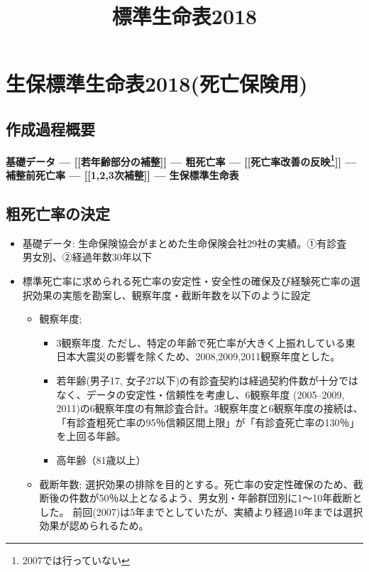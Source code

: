 \documentclass[]{article}
\begin{document}
\title{標準生命表2018\citep{lifetable2018}}

\section*{生保標準生命表2018(死亡保険用)}
\subsection*{作成過程概要}

\bf{基礎データ} --- [[若年齢部分の補整]] --- \bf{粗死亡率} 
--- [[死亡率改善の反映\footnote{2007では行っていない}]] --- \bf{補整前死亡率} --- [[1,2,3次補整]] --- \bf{生保標準生命表}

\subsection*{粗死亡率の決定}

\begin{itemize}
    \item 基礎データ: 生命保険協会がまとめた生命保険会社29社の実績。①有診査　男女別、②経過年数30年以下
    \item 標準死亡率に求められる死亡率の安定性・安全性の確保及び経験死亡率の選択効果の実態を勘案し、観察年度・截断年数を以下のように設定
    \begin{itemize}
        \item 観察年度; 
        \begin{itemize}
            \item 3観察年度. ただし、特定の年齢で死亡率が大きく上振れしている東日本大震災の影響を除くため、2008,2009,2011観察年度とした。
            \item 若年齢(男子17, 女子27以下)の有診査契約は経過契約件数が十分ではなく、データの安定性・信頼性を考慮し、6観察年度 (2005--2009, 2011)の6観察年度の有無診査合計。3観察年度と6観察年度の接続は、「有診査粗死亡率の95％信頼区間上限」が「有診査死亡率の130％」を上回る年齢。
            \item 高年齢（81歳以上）
        \end{itemize}
        
        \item 截断年数; 選択効果の排除を目的とする。死亡率の安定性確保のため、截断後の件数が50％以上となるよう、男女別・年齢群団別に1〜10年截断とした。
        前回(2007)は5年までとしていたが、実績より経過10年までは選択効果が認められるため。
    \end{itemize}
\end{itemize}



\end{document}
